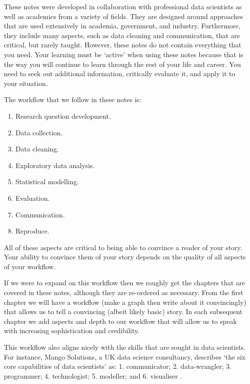 \documentclass[
]{book}
\providecommand{\tightlist}{%
  \setlength{\itemsep}{0pt}\setlength{\parskip}{0pt}}
\begin{document}
These notes were developed in collaboration with professional data scientists as well as academics from a variety of fields. They are designed around approaches that are used extensively in academia, government, and industry. Furthermore, they include many aspects, such as data cleaning and communication, that are critical, but rarely taught. However, these notes do not contain everything that you need. Your learning must be `active' when using these notes because that is the way you will continue to learn through the rest of your life and career. You need to seek out additional information, critically evaluate it, and apply it to your situation.

The workflow that we follow in these notes is:

\begin{enumerate}
\def\labelenumi{\arabic{enumi}.}
\tightlist
\item
  Research question development.
\item
  Data collection.
\item
  Data cleaning.
\item
  Exploratory data analysis.
\item
  Statistical modelling.
\item
  Evaluation.
\item
  Communication.
\item
  Reproduce.
\end{enumerate}

All of these aspects are critical to being able to convince a reader of your story. Your ability to convince them of your story depends on the quality of all aspects of your workflow.

If we were to expand on this workflow then we roughly get the chapters that are covered in these notes, although they are re-ordered as necessary. From the first chapter we will have a workflow (make a graph then write about it convincingly) that allows us to tell a convincing (albeit likely basic) story. In each subsequent chapter we add aspects and depth to our workflow that will allow us to speak with increasing sophistication and credibility.

This workflow also aligns nicely with the skills that are sought in data scientists. For instance, Mango Solutions, a UK data science consultancy, describes `the six core capabilities of data scientists' as: 1. communicator; 2. data-wrangler; 3. programmer; 4. technologist; 5. modeller; and 6. visualiser \citep{mangosolutions}.
\end{document}
